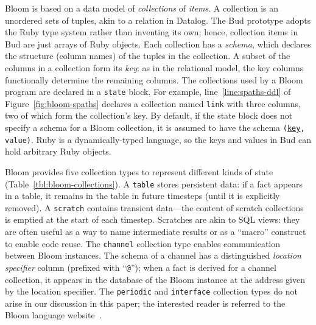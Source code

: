 Bloom is based on a data model of \emph{collections} of {\em items}.  A collection is an unordered sets of tuples, akin to a relation in Datalog. The Bud prototype adopts the Ruby type system rather than inventing its own; hence, collection items in Bud are just arrays of Ruby objects. Each collection has a \emph{schema}, which declares the
structure (column names) of the tuples in the collection. A subset of the
columns in a collection form its \emph{key}: as in the relational model, the key columns
functionally determine the remaining columns. The collections used by a Bloom
program are declared in a \texttt{state} block. For example,
line~\ref{line:spaths-ddl} of Figure~\ref{fig:bloom-spaths} declares a
collection named \texttt{link} with three columns, two of which form the
collection's key.  By default, if the state block does not specify a schema for a Bloom collection, it is assumed to have the schema \texttt{(\underline{key}, value)}.  Ruby is a dynamically-typed language, so the keys and values in Bud can hold arbitrary Ruby objects.

Bloom provides five collection types to represent different kinds of state
(Table~\ref{tbl:bloom-collections}). A \texttt{table} stores persistent data: if
a fact appears in a table, it remains in the table in future timesteps (until it
is explicitly removed). A \texttt{scratch} contains transient data---the content
of scratch collections is emptied at the start of each timestep. Scratches are
akin to SQL views: they are often useful as a way to name intermediate results
or as a ``macro'' construct to enable code reuse. The \texttt{channel}
collection type enables communication between Bloom instances. The schema of a
channel has a distinguished \emph{location specifier} column (prefixed with
``\texttt{@}''); when a fact is derived for a channel collection, it appears in
the database of the Bloom instance at the address given by the location
specifier. The \texttt{periodic} and \texttt{interface} collection types do not arise in our discussion in this paper; the interested reader is referred to the Bloom language website~\cite{bloom}.

